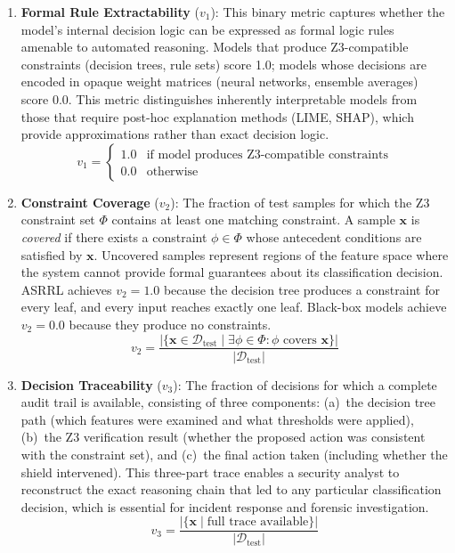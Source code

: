 \documentclass[12pt, letterpaper, oneside]{report}
\newcommand{\ASRRL}{\textsc{ASRRL}}
\newcommand{\bx}{\mathbf{x}}
\begin{document}
\begin{enumerate}
    \item \textbf{Formal Rule Extractability} ($v_1$): This binary metric captures whether the model's internal decision logic can be expressed as formal logic rules amenable to automated reasoning. Models that produce Z3-compatible constraints (decision trees, rule sets) score 1.0; models whose decisions are encoded in opaque weight matrices (neural networks, ensemble averages) score 0.0. This metric distinguishes inherently interpretable models from those that require post-hoc explanation methods (LIME, SHAP), which provide approximations rather than exact decision logic.
    \begin{equation}
    v_1 = \begin{cases} 1.0 & \text{if model produces Z3-compatible constraints} \\ 0.0 & \text{otherwise} \end{cases}
    \end{equation}

    \item \textbf{Constraint Coverage} ($v_2$): The fraction of test samples for which the Z3 constraint set $\Phi$ contains at least one matching constraint. A sample $\bx$ is \emph{covered} if there exists a constraint $\phi \in \Phi$ whose antecedent conditions are satisfied by $\bx$. Uncovered samples represent regions of the feature space where the system cannot provide formal guarantees about its classification decision. \ASRRL{} achieves $v_2 = 1.0$ because the decision tree produces a constraint for every leaf, and every input reaches exactly one leaf. Black-box models achieve $v_2 = 0.0$ because they produce no constraints.
    \begin{equation}
    v_2 = \frac{|\{\bx \in \mathcal{D}_{\text{test}} \mid \exists \phi \in \Phi : \phi \text{ covers } \bx\}|}{|\mathcal{D}_{\text{test}}|}
    \end{equation}

    \item \textbf{Decision Traceability} ($v_3$): The fraction of decisions for which a complete audit trail is available, consisting of three components: (a)~the decision tree path (which features were examined and what thresholds were applied), (b)~the Z3 verification result (whether the proposed action was consistent with the constraint set), and (c)~the final action taken (including whether the shield intervened). This three-part trace enables a security analyst to reconstruct the exact reasoning chain that led to any particular classification decision, which is essential for incident response and forensic investigation.
    \begin{equation}
    v_3 = \frac{|\{\bx \mid \text{full trace available}\}|}{|\mathcal{D}_{\text{test}}|}
    \end{equation}


\end{enumerate}
\end{document}
